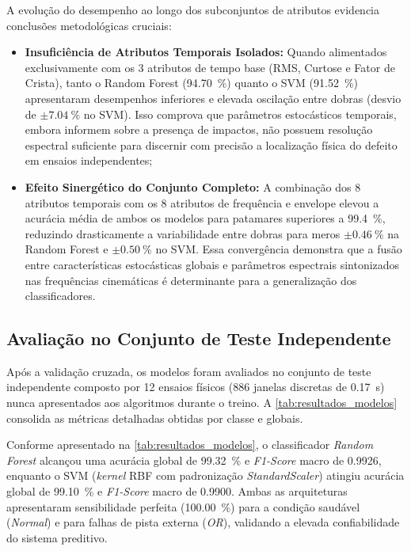 A evolução do desempenho ao longo dos subconjuntos de atributos evidencia conclusões metodológicas cruciais:
\begin{itemize}
    \item \textbf{Insuficiência de Atributos Temporais Isolados:} Quando alimentados exclusivamente com os 3 atributos de tempo base (RMS, Curtose e Fator de Crista), tanto o Random Forest (\SI{94,70}{\percent}) quanto o SVM (\SI{91,52}{\percent}) apresentaram desempenhos inferiores e elevada oscilação entre dobras (desvio de $\pm \SI{7,04}{\percent}$ no SVM). Isso comprova que parâmetros estocásticos temporais, embora informem sobre a presença de impactos, não possuem resolução espectral suficiente para discernir com precisão a localização física do defeito em ensaios independentes;
    \item \textbf{Efeito Sinergético do Conjunto Completo:} A combinação dos 8 atributos temporais com os 8 atributos de frequência e envelope elevou a acurácia média de ambos os modelos para patamares superiores a \SI{99,4}{\percent}, reduzindo drasticamente a variabilidade entre dobras para meros $\pm \SI{0,46}{\percent}$ na Random Forest e $\pm \SI{0,50}{\percent}$ no SVM. Essa convergência demonstra que a fusão entre características estocásticas globais e parâmetros espectrais sintonizados nas frequências cinemáticas é determinante para a generalização dos classificadores.
\end{itemize}

\subsection{Avaliação no Conjunto de Teste Independente}
Após a validação cruzada, os modelos foram avaliados no conjunto de teste independente composto por 12 ensaios físicos (\num{886} janelas discretas de \SI{0,17}{\second}) nunca apresentados aos algoritmos durante o treino. A \autoref{tab:resultados_modelos} consolida as métricas detalhadas obtidas por classe e globais.



Conforme apresentado na \autoref{tab:resultados_modelos}, o classificador \textit{Random Forest} alcançou uma acurácia global de \SI{99,32}{\percent} e \textit{F1-Score} macro de \num{0,9926}, enquanto o SVM (\textit{kernel} RBF com padronização \textit{StandardScaler}) atingiu acurácia global de \SI{99,10}{\percent} e \textit{F1-Score} macro de \num{0,9900}. Ambas as arquiteturas apresentaram sensibilidade perfeita (\SI{100,00}{\percent}) para a condição saudável (\textit{Normal}) e para falhas de pista externa (\textit{OR}), validando a elevada confiabilidade do sistema preditivo.

